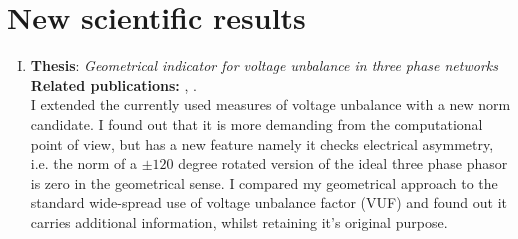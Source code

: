 \section{New scientific results}

\begin{enumerate}[I.)]

\item\textbf{Thesis}: \emph{Geometrical indicator for voltage unbalance in three phase networks}\\
    \textbf{Related publications:} \cite{neukirchner2015examination}, \cite{Neukirchner2015}.\\
    I extended the currently used measures of voltage unbalance with a new norm candidate. I found out that it is more demanding from the computational point of view, but has a new feature namely it checks electrical asymmetry, i.e. the norm of a $\pm120$ degree rotated version of the ideal three phase phasor is zero in the geometrical sense. I compared my geometrical approach to the standard wide-spread use of voltage unbalance factor (VUF) and found out it carries additional information, whilst retaining it's original purpose.\\
		

\end{enumerate}
